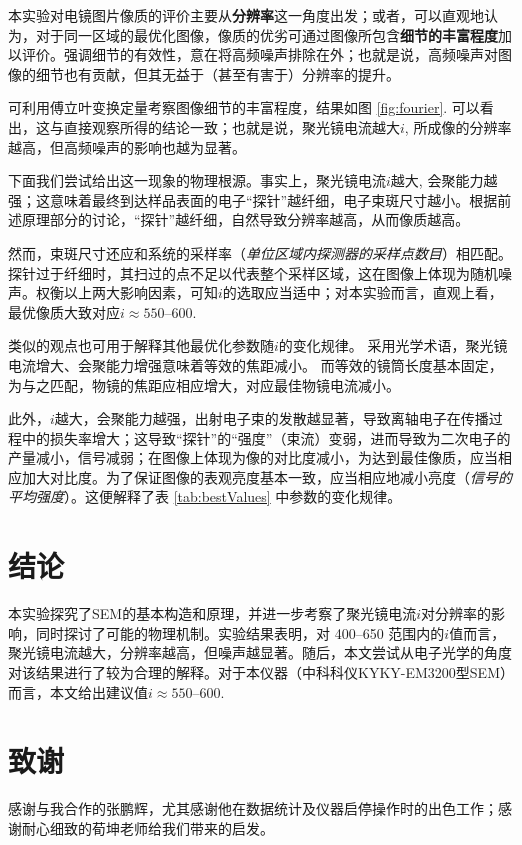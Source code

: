 \documentclass[aps,pre,12pt,preprint,%
	onecolumn,showpacs,showkeys,nofootinbib]{revtex4-1}
\begin{document}
\restoregeometry
\FloatBarrier
\clearpage

	本实验对电镜图片像质的评价主要从\textbf{分辨率}这一角度出发；或者，可以直观地认为，对于同一区域的最优化图像，像质的优劣可通过图像所包含\textbf{细节的丰富程度}加以评价。强调细节的有效性，意在将高频噪声排除在外；也就是说，高频噪声对图像的细节也有贡献，但其无益于（甚至有害于）分辨率的提升。
	
	可利用傅立叶变换定量考察图像细节的丰富程度，结果如图 \ref{fig:fourier}. 可以看出，这与直接观察所得的结论一致；也就是说，聚光镜电流越大$i$, 所成像的分辨率越高，但高频噪声的影响也越为显著。
	
	\newparagraph
	下面我们尝试给出这一现象的物理根源。事实上，聚光镜电流$i$越大, 会聚能力越强；这意味着最终到达样品表面的电子“探针”越纤细，电子束斑尺寸越小。根据前述原理部分的讨论，“探针”越纤细，自然导致分辨率越高，从而像质越高。
	
	然而，束斑尺寸还应和系统的采样率（\textit{单位区域内探测器的采样点数目}）相匹配。探针过于纤细时，其扫过的点不足以代表整个采样区域，这在图像上体现为随机噪声。权衡以上两大影响因素，可知$i$的选取应当适中；对本实验而言，直观上看，最优像质大致对应$i \approx \numrange{550}{600}$. 
	
	类似的观点也可用于解释其他最优化参数随$i$的变化规律。
	采用光学术语，聚光镜电流增大、会聚能力增强意味着等效的焦距减小。
	而等效的镜筒长度基本固定，为与之匹配，物镜的焦距应相应增大，对应最佳物镜电流减小。
	
	此外，$i$越大，会聚能力越强，出射电子束的发散越显著，导致离轴电子在传播过程中的损失率增大；这导致“探针”的“强度”（束流）变弱，进而导致为二次电子的产量减小，信号减弱；在图像上体现为像的对比度减小，为达到最佳像质，应当相应加大对比度。为了保证图像的表观亮度基本一致，应当相应地减小亮度（\textit{信号的平均强度}）。这便解释了表 \ref{tab:bestValues} 中参数的变化规律。
\section{结论}
	本实验探究了SEM的基本构造和原理，并进一步考察了聚光镜电流$i$对分辨率的影响，同时探讨了可能的物理机制。实验结果表明，对 \numrange{400}{650} 范围内的$i$值而言，聚光镜电流越大，分辨率越高，但噪声越显著。随后，本文尝试从电子光学的角度对该结果进行了较为合理的解释。对于本仪器（中科科仪KYKY-EM3200型SEM）而言，本文给出建议值$i \approx \numrange{550}{600}$. 
\section{致谢}
	感谢与我合作的张鹏辉，尤其感谢他在数据统计及仪器启停操作时的出色工作；感谢耐心细致的荀坤老师给我们带来的启发。
\end{document}

